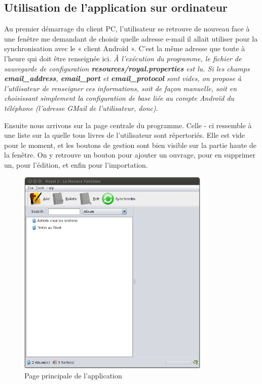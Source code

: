 \subsection{Utilisation de l'application sur ordinateur}
Au premier démarrage du client PC, l'utilisateur se retrouve de nouveau face à une fenêtre me demandant de choisir quelle adresse e-mail il allait utiliser pour la synchronisation avec le « client Androïd ». 
C'est la même adresse que toute à l'heure qui doit être renseignée ici.
\emph{À l'exécution du programme, le fichier de sauvegarde de configuration \textbf{resources/royal.properties} est lu. 
	Si les champs \textbf{email\_address}, \textbf{email\_port} et \textbf{email\_protocol} sont vides, 
	on propose à l'utilisateur de renseigner ces informations, soit de façon manuelle, 
	soit en choisissant simplement la configuration de base liée au compte Androïd du téléphone (l'adresse GMail de l'utilisateur, donc).
}

Ensuite nous arrivons sur la page centrale du programme.
Celle - ci ressemble à une liste sur la quelle tous livres de l'utilisateur sont répertoriés.
Elle est vide pour le moment, et les boutons de gestion sont bien visible sur la partie haute de la fenêtre. 
On y retrouve un bouton pour ajouter un ouvrage, pour en supprimer un, pour l'édition, et enfin pour l'importation. 

\begin{figure}
\begin{center}
\includegraphics[height=10cm]{../img/principaleModifiee.png}
\end{center}
\caption{Page principale de l'application}
\end{figure}

